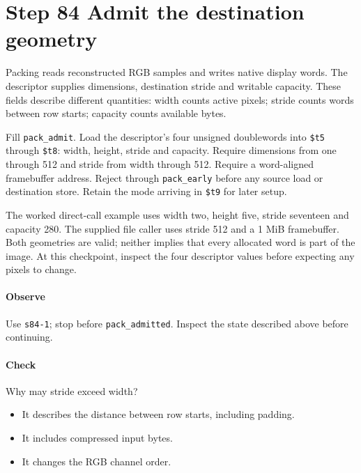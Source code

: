 \section{Step 84 Admit the destination geometry}
Packing reads reconstructed RGB samples and writes native display words. The descriptor supplies dimensions, destination stride and writable capacity. These fields describe different quantities: width counts active pixels; stride counts words between row starts; capacity counts available bytes.

Fill \texttt{pack\_admit}. Load the descriptor’s four unsigned doublewords into \texttt{\$t5} through \texttt{\$t8}: width, height, stride and capacity. Require dimensions from one through 512 and stride from width through 512. Require a word-aligned framebuffer address. Reject through \texttt{pack\_early} before any source load or destination store. Retain the mode arriving in \texttt{\$t9} for later setup.

The worked direct-call example uses width two, height five, stride seventeen and capacity 280. The supplied file caller uses stride 512 and a 1 MiB framebuffer. Both geometries are valid; neither implies that every allocated word is part of the image. At this checkpoint, inspect the four descriptor values before expecting any pixels to change.

\paragraph{Observe} Use \texttt{s84-1}; stop before \texttt{pack\_admitted}. Inspect the state described above before continuing.

\paragraph{Check} Why may stride exceed width?
\begin{itemize}
\item[A.] It describes the distance between row starts, including padding.
\item[B.] It includes compressed input bytes.
\item[C.] It changes the RGB channel order.
\end{itemize}
